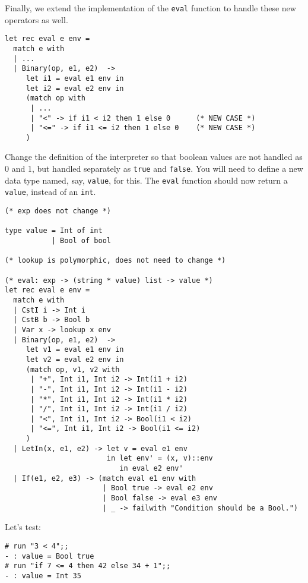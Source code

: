 \documentclass[addpoints]{exam}
\begin{document}
\begin{questions}
\begin{solution}
    Finally, we extend the implementation of the \texttt{eval}
    function to handle these new operators as well.

    {\small
    \begin{verbatim}      
let rec eval e env =
  match e with
  | ...
  | Binary(op, e1, e2)  ->
     let i1 = eval e1 env in
     let i2 = eval e2 env in
     (match op with
      | ...
      | "<" -> if i1 < i2 then 1 else 0      (* NEW CASE *)
      | "<=" -> if i1 <= i2 then 1 else 0    (* NEW CASE *)
     )
    \end{verbatim}
    }
  \end{solution}

  
  \question
  Change the definition of the interpreter so that boolean values are not handled
  as 0 and 1, but handled separately as \texttt{true} and \texttt{false}.
  You will need to define a new data type named, say, \texttt{value}, for this.
  The \texttt{eval} function should now return a \texttt{value},
  instead of an \texttt{int}.

  \begin{solution}
    \begin{verbatim}
(* exp does not change *)

type value = Int of int
           | Bool of bool

(* lookup is polymorphic, does not need to change *)

(* eval: exp -> (string * value) list -> value *)
let rec eval e env =
  match e with
  | CstI i -> Int i
  | CstB b -> Bool b
  | Var x -> lookup x env
  | Binary(op, e1, e2)  ->
     let v1 = eval e1 env in
     let v2 = eval e2 env in
     (match op, v1, v2 with
      | "+", Int i1, Int i2 -> Int(i1 + i2)
      | "-", Int i1, Int i2 -> Int(i1 - i2)
      | "*", Int i1, Int i2 -> Int(i1 * i2)
      | "/", Int i1, Int i2 -> Int(i1 / i2)
      | "<", Int i1, Int i2 -> Bool(i1 < i2)
      | "<=", Int i1, Int i2 -> Bool(i1 <= i2)
     )
  | LetIn(x, e1, e2) -> let v = eval e1 env
                        in let env' = (x, v)::env
                           in eval e2 env'
  | If(e1, e2, e3) -> (match eval e1 env with
                       | Bool true -> eval e2 env
                       | Bool false -> eval e3 env
                       | _ -> failwith "Condition should be a Bool.")
    \end{verbatim}


    Let's test:
    \begin{verbatim}
# run "3 < 4";;
- : value = Bool true
# run "if 7 <= 4 then 42 else 34 + 1";;
- : value = Int 35
    \end{verbatim}
  \end{solution}
  


\end{questions}
\end{document}
